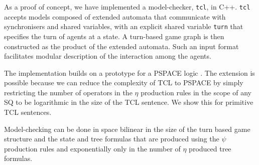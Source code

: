 \documentclass{llncs}
\begin{document}
As a proof of concept, we have implemented a model-checker, {\tt tcl}, in C++.  
{\tt tcl} accepts models composed of extended automata that 
communicate with synchronisers and shared variables, with 
an explicit shared variable {\tt turn} that specifies the turn of 
agents at a state. 
A turn-based game graph is then constructed as the product of 
the extended automata.  
Such an input format facilitates modular description of the interaction 
among the agents. 

The implementation builds on a prototype for a PSPACE logic \cite{WHY11}.
The extension is possible because we can reduce the complexity of TCL to PSPACE by simply restricting the number of operators in the $\eta$ production rules in the scope of any SQ to be logarithmic in the size of the TCL sentence.
%
We show this for primitive TCL sentences.

\begin{lemma}
\label{lemma.tt.depth}
Model-checking can be done in space bilinear in the size of the turn based game structure and the state and tree formulas that are produced using the $\psi$ production rules and exponentially only in the number of $\eta$ produced tree formulas.
\end{lemma}
\end{document}
